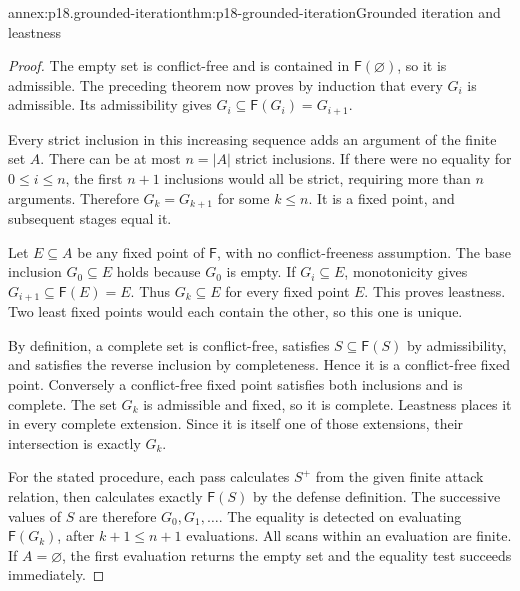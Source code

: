 \begin{annexitem}{annex:p18.grounded-iteration}{thm:p18-grounded-iteration}{Grounded iteration and leastness}
\begin{proof}
The empty set is conflict-free and is contained in \(\mathsf F(\varnothing)\),
so it is admissible. The preceding theorem now proves by induction that
every \(G_i\) is admissible. Its admissibility gives
\(G_i\subseteq\mathsf F(G_i)=G_{i+1}\).

Every strict inclusion in this increasing sequence adds an argument of the
finite set \(A\). There can be at most \(n=|A|\) strict inclusions.
If there were no equality for \(0\leq i\leq n\), the first \(n+1\)
inclusions would all be strict, requiring more than \(n\) arguments.
Therefore \(G_k=G_{k+1}\) for some \(k\leq n\). It is a fixed
point, and subsequent stages equal it.

Let \(E\subseteq A\) be any fixed point of \(\mathsf F\), with no
conflict-freeness assumption. The base inclusion \(G_0\subseteq E\)
holds because \(G_0\) is empty. If \(G_i\subseteq E\), monotonicity
gives \(G_{i+1}\subseteq\mathsf F(E)=E\). Thus \(G_k\subseteq E\)
for every fixed point \(E\). This proves leastness. Two least fixed
points would each contain the other, so this one is unique.

By definition, a complete set is conflict-free, satisfies
\(S\subseteq\mathsf F(S)\) by admissibility, and satisfies the reverse
inclusion by completeness. Hence it is a conflict-free fixed point.
Conversely a conflict-free fixed point satisfies both inclusions and is
complete. The set \(G_k\) is admissible and fixed, so it is complete.
Leastness places it in every complete extension. Since it is itself one of
those extensions, their intersection is exactly \(G_k\).

For the stated procedure, each pass calculates \(S^+\) from the given
finite attack relation, then calculates exactly \(\mathsf F(S)\) by the
defense definition. The successive values of \(S\) are therefore
\(G_0,G_1,\ldots\). The equality is detected on evaluating
\(\mathsf F(G_k)\), after \(k+1\leq n+1\) evaluations. All scans
within an evaluation are finite. If \(A=\varnothing\), the first
evaluation returns the empty set and the equality test succeeds immediately.
\end{proof}
\end{annexitem}

